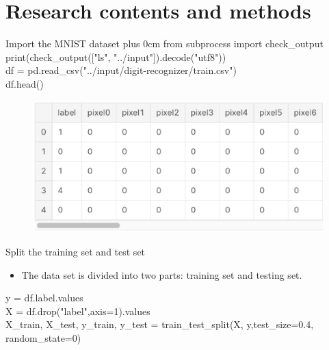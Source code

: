 \documentclass[
 size=14pt,
 paper=smartboard,  %
 mode=present, 		%
 display=slides, 	%
 style=tuliplab,  	%
 pauseslide,
 fleqn,leqno]{powerdot}
\renewcommand{\raggedright}{\leftskip=0pt \rightskip=0pt plus 0cm}
\begin{document}
\section{Research contents and methods}

\begin{slide}{Import the MNIST dataset}
	\raggedright
from subprocess import check_output\\
print(check_output(["ls", "../input"]).decode("utf8"))\\
df = pd.read_csv("../input/digit-recognizer/train.csv")\\
df.head()
\begin{center}
	\begin{figure}[htbp]
		\includegraphics[scale=0.7]{./pic/2.eps}
	\end{figure}
\end{center}

\end{slide}

\begin{slide}{Split the training set and test set}
	\begin{itemize}
	\item 	The data set is divided into two parts: training set and testing set.\\
	\end{itemize}

y = df.label.values\\
X = df.drop("label",axis=1).values\\
X_train, X_test, y_train, y_test = train_test_split(X, y,test_size=0.4, random_state=0)\\

\end{slide}
\end{document}

